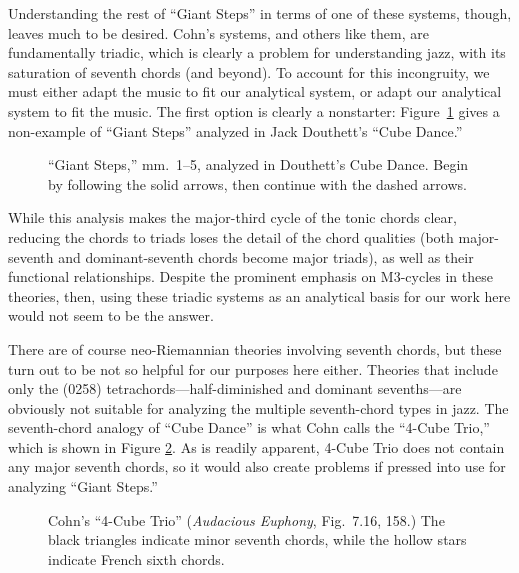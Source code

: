 Understanding the rest of ``Giant Steps'' in terms of one of these systems,
though, leaves much to be desired. Cohn's systems, and others like them, are
fundamentally triadic, which is clearly a problem for understanding jazz, with
its saturation of seventh chords (and beyond). To account for this
incongruity, we must either adapt the music to fit our analytical system, or
adapt our analytical system to fit the music. The first option is clearly a
nonstarter: Figure~\ref{maj3:gs-cube-dance} gives a non-example of ``Giant
Steps'' analyzed in Jack Douthett's ``Cube Dance.''
%
\begin{figure}[tbp]
  \caption[``Giant Steps'' analyzed in Douthett's Cube Dance.]{``Giant
    Steps,'' mm.~1--5, analyzed in Douthett's Cube Dance. Begin by following the
    solid arrows, then continue with the dashed arrows.}
  \label{maj3:gs-cube-dance}
\end{figure}
%
While this analysis makes the major-third cycle of the tonic chords clear,
reducing the chords to triads loses the detail of the chord qualities (both
major-seventh and dominant-seventh chords become major triads), as well as
their functional relationships. Despite the prominent emphasis on M3-cycles in
these theories, then, using these triadic systems as an analytical basis for
our work here would not seem to be the answer.

There are of course neo-Riemannian theories involving seventh chords, but
these turn out to be not so helpful for our purposes here either. Theories
that include only the (0258) tetrachords---half-diminished and dominant
sevenths---are obviously not suitable for analyzing the multiple seventh-chord
types in jazz. The seventh-chord analogy of ``Cube Dance'' is what Cohn calls
the ``4-Cube Trio,'' which is shown in Figure
\ref{maj3:four-cube-trio}. As is readily apparent, 4-Cube Trio
does not contain any major seventh chords, so it would also create problems if
pressed into use for analyzing ``Giant Steps.''

\begin{figure}[tbp]
  \caption[Cohn's ``4-Cube Trio'']{Cohn's ``4-Cube Trio'' (\emph{Audacious
    Euphony}, Fig.~7.16, 158.) The black triangles indicate minor seventh chords,
    while the hollow stars indicate French sixth chords.}
  \label{maj3:four-cube-trio}
\end{figure}

